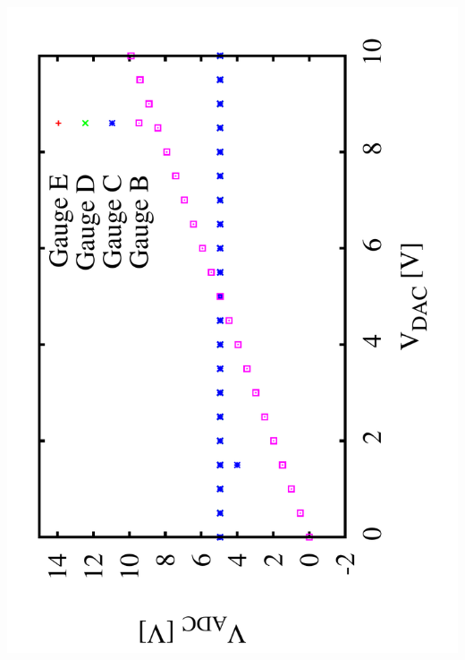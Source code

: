 \documentclass[a4paper,11pt]{book}
\begin{document}
 \includegraphics[angle=-90,scale=0.20]{image_ai_03.pdf}
\end{document}

